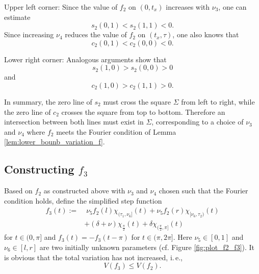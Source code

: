 \documentclass{article}
\newcommand{\ite}{i.\,e.\xspace}
\begin{document}
Upper left corner: Since the value of $f_2$ on $(0, t_x)$ increases with $\nu_3$, one can estimate
\[s_2(0,1) < s_2(1,1) < 0.\]
Since increasing $\nu_4$ reduces the value of $f_2$ on $(t_x,\tau)$, one also knows that
\[c_2(0,1) < c_2(0,0) < 0.\]

Lower right corner: Analogous arguments show that
\[s_2(1,0) > s_2(0,0) > 0\] 
and 
\[c_2(1,0) > c_2(1,1) > 0.\]

In summary, the zero line of $s_2$ must cross the square $\Sigma$ from left to right, while the zero line of $c_2$ crosses the square from top to bottom. Therefore an intersection between both lines must exist in $\Sigma$, corresponding to a choice of $\nu_3$ and $\nu_4$ where $f_2$ meets the Fourier condition of Lemma \ref{lem:lower_bounb_variation_f}.

\subsection{Constructing $f_3$}

Based on $f_2$ as constructed above with $\nu_3$ and $\nu_4$ chosen such that the Fourier condition holds, define the simplified step function 
\begin{equation} \label{eq:def_f3_new}
    \begin{aligned}
         f_3(t) :=& \;\nu_5 f_2(l)\chi_{(\tau_1,\nu_6]}(t) + \nu_5f_2(r) \chi_{[\nu_6,\tau_2)}(t)\\
        &+ (\delta + \nu) \chi_{\frac{\pi}{2}}(t) + \delta \chi_{(\frac{\pi}{2}, \pi]}(t)
    \end{aligned}
\end{equation}
for $t \in (0,\pi]$ and $f_3(t) = - f_3(t-\pi)$ for $t \in (\pi, 2\pi]$. Here 
$\nu_5 \in [0,1]$ and $\nu_6 \in [l,r]$ are two initially unknown parameters (cf. Figure \ref{fig:plot_f2_f3}).
It is obvious that the total variation has not increased, \ite, 
\[V(f_3) \le V(f_2).\]
\end{document}
